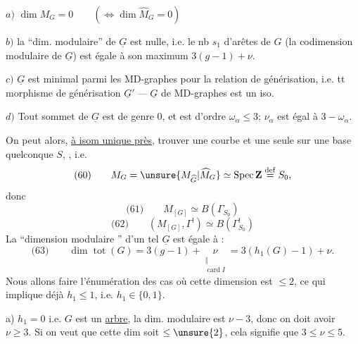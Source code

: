 $a)$ $\dim M_G=0\qquad(\Longleftrightarrow\dim\widehat M_G=0)$

$b)$  la ``dim. modulaire'' de $\underline G$ est nulle, i.e. le nb $s_1$ d'arêtes de  $G$ (la codimension modulaire de $\underline G$) est égale à son maximum $3(g-1)+\nu$.

$c)$  $\underline G$ est minimal parmi les MD-graphes pour la relation de générisation, i.e. tt morphisme de générisation $\underline G'\mathbin{\text{---}}\underline G$ de MD-graphes est un iso.

$d)$ Tout sommet \inserted{$\alpha$} de $\underline G$ est de genre $0$, et est d'ordre  $\omega_\alpha\leq3$;   $\nu_\alpha$ est égal à $3-\omega_\alpha$.

On peut alors, \uline{à isom unique près}, trouver une courbe   et une seule sur une base quelconque $S$, , i.e.
\[
\text{(60)}\qquad M_G=\unsure{M_{\widehat G}|\widehat M_G}\simeq\operatorname{Spec}\mathbf Z\overset{\mathrm{def}}=S_0,
\]
donc
\[
\text{(61)}\qquad M_{[G]}\simeq B(\Gamma_{S_0})
\]
\[
\text{(62)}\qquad(M_{[G]},\Gamma^!)\simeq B(\Gamma^!_{S_0})
\]
La ``dimension modulaire '' d'un tel $\underline G$ est égale à :
\[
\text{(63)}\qquad\dim\operatorname{tot}(G)=3(g-1)+\underset{\substack{\Vert\\\operatorname{card}I}}{\nu}=3(h_1(G)-1)+\nu.
\]
Nous allons faire l'énumération des cas où cette dimension est $\leq2$, ce qui implique déjà $h_1\leq1$, i.e. $h_1\in\{0,1\}$.


a) $h_1=0$ i.e. $G$ est un \uline{arbre}, la dim. modulaire est $\nu-3$, donc on doit avoir $\nu\geq3$. Si on veut que cette dim soit $\leq\unsure{2}$, cela signifie que $3\leq\nu\leq5$.

